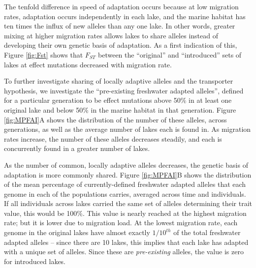 \documentclass{article}
\begin{document}
The tenfold difference in speed of adaptation occurs because
at low migration rates, adaptation occurs independently in each lake,
and the marine habitat has ten times the influx of new alleles than any one lake.
In other words, 
greater mixing at higher migration rates allows lakes to share alleles
instead of developing their own genetic basis of adaptation.
As a first indication of this, Figure \ref{fig:Fst} shows that
$F_{ST}$ between the ``original'' and ``introduced'' sets of lakes 
at effect mutations decreased with migration rate.

To further investigate sharing of locally adaptive alleles
and the transporter hypothesis,
we investigate the ``pre-existing freshwater adapted alleles'',
defined for a particular generation
to be effect mutations above 50\% in at least one original lake and below 50\% in the marine habitat
in that generation.
Figure \ref{fig:MPFAI}A shows the distribution of the number of these alleles,
across generations,
as well as the average number of lakes each is found in.
As migration rates increase, the number of these alleles decreases steadily,
and each is concurrently found in a greater number of lakes.

As the number of common, locally adaptive alleles decreases,
the genetic basis of adaptation is more commonly shared.
Figure \ref{fig:MPFAI}B shows
the distribution of the mean percentage of currently-defined freshwater adapted alleles 
that each genome in each of the populations carries,
averaged across time and individuals.
If all individuals across lakes carried the same set of alleles determining their trait value,
this would be 100\%.
This value is nearly reached at the highest migration rate;
but it is lower due to migration load.
At the lowest migration rate, 
each genome in the original lakes have almost exactly $1/10^{th}$ 
of the total freshwater adapted alleles --
since there are 10 lakes, this implies that each lake has adapted with a unique set of alleles.
Since these are \emph{pre-existing} alleles, the value is zero for introduced lakes.
\end{document}
